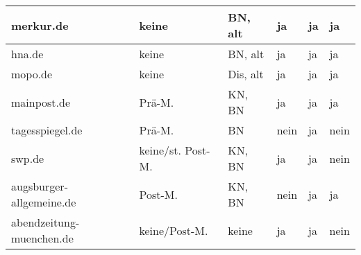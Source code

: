 \begin{longtable}{p{28mm}*{5}{l}}
merkur.de
& keine
& BN, alt
& ja
& ja
& ja
\\*\midrule

hna.de
& keine
& BN, alt
& ja
& ja
& ja
\\*\midrule

mopo.de
& keine
& Dis, alt
& ja
& ja
& ja
\\*\midrule

mainpost.de
& Prä-M.
& KN, BN
& ja
& ja
& ja
\\*\midrule

tagesspiegel.de
& Prä-M.
& BN
& nein
& ja
& nein
\\*\midrule

swp.de
& keine/st. Post-M.
& KN, BN
& ja
& ja
& nein
\\*\midrule

augsburger-allgemeine.de
& Post-M.
& KN, BN
& nein
& ja
& ja
\\*\midrule

abendzeitung-muenchen.de
& keine/Post-M.
& keine
& ja
& ja
& nein


  \end{longtable}
\endgroup

